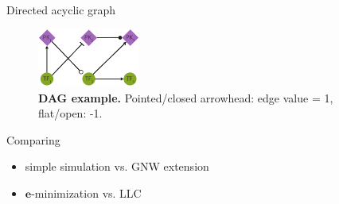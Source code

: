 \begin{frame}{Directed acyclic graph}
\label{sec:dag}
\begin{figure}[ht]
    \centering
    \includegraphics[width=0.3\textwidth]{analysis/fig/dag.pdf}
    \caption{\textbf{DAG example.} Pointed/closed arrowhead: edge value = 1, flat/open: -1. }
    \label{fig:dag}
\end{figure}
Comparing
\begin{itemize}
    \item simple simulation vs. GNW extension
    \item $\boldsymbol{e}$-minimization vs. LLC
\end{itemize}
\end{frame}

